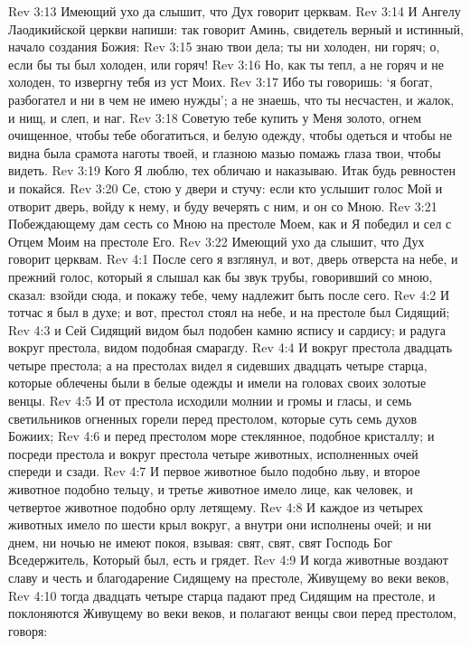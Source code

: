 Rev 3:13  Имеющий ухо да слышит, что Дух говорит церквам.
Rev 3:14  И Ангелу Лаодикийской церкви напиши: так говорит Аминь, свидетель верный и истинный, начало создания Божия:
Rev 3:15  знаю твои дела; ты ни холоден, ни горяч; о, если бы ты был холоден, или горяч!
Rev 3:16  Но, как ты тепл, а не горяч и не холоден, то извергну тебя из уст Моих.
Rev 3:17  Ибо ты говоришь: `я богат, разбогател и ни в чем не имею нужды'; а не знаешь, что ты несчастен, и жалок, и нищ, и слеп, и наг.
Rev 3:18  Советую тебе купить у Меня золото, огнем очищенное, чтобы тебе обогатиться, и белую одежду, чтобы одеться и чтобы не видна была срамота наготы твоей, и глазною мазью помажь глаза твои, чтобы видеть.
Rev 3:19  Кого Я люблю, тех обличаю и наказываю. Итак будь ревностен и покайся.
Rev 3:20  Се, стою у двери и стучу: если кто услышит голос Мой и отворит дверь, войду к нему, и буду вечерять с ним, и он со Мною.
Rev 3:21  Побеждающему дам сесть со Мною на престоле Моем, как и Я победил и сел с Отцем Моим на престоле Его.
Rev 3:22  Имеющий ухо да слышит, что Дух говорит церквам.
Rev 4:1  После сего я взглянул, и вот, дверь отверста на небе, и прежний голос, который я слышал как бы звук трубы, говоривший со мною, сказал: взойди сюда, и покажу тебе, чему надлежит быть после сего.
Rev 4:2  И тотчас я был в духе; и вот, престол стоял на небе, и на престоле был Сидящий;
Rev 4:3  и Сей Сидящий видом был подобен камню яспису и сардису; и радуга вокруг престола, видом подобная смарагду.
Rev 4:4  И вокруг престола двадцать четыре престола; а на престолах видел я сидевших двадцать четыре старца, которые облечены были в белые одежды и имели на головах своих золотые венцы.
Rev 4:5  И от престола исходили молнии и громы и гласы, и семь светильников огненных горели перед престолом, которые суть семь духов Божиих;
Rev 4:6  и перед престолом море стеклянное, подобное кристаллу; и посреди престола и вокруг престола четыре животных, исполненных очей спереди и сзади.
Rev 4:7  И первое животное было подобно льву, и второе животное подобно тельцу, и третье животное имело лице, как человек, и четвертое животное подобно орлу летящему.
Rev 4:8  И каждое из четырех животных имело по шести крыл вокруг, а внутри они исполнены очей; и ни днем, ни ночью не имеют покоя, взывая: свят, свят, свят Господь Бог Вседержитель, Который был, есть и грядет.
Rev 4:9  И когда животные воздают славу и честь и благодарение Сидящему на престоле, Живущему во веки веков,
Rev 4:10  тогда двадцать четыре старца падают пред Сидящим на престоле, и поклоняются Живущему во веки веков, и полагают венцы свои перед престолом, говоря:
